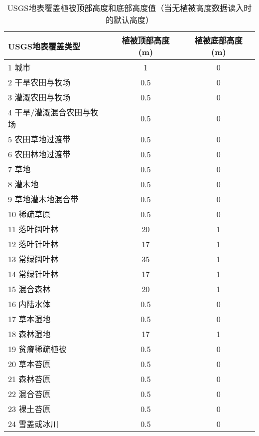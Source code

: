 \begin{table}[]
    \centering
    \caption{USGS地表覆盖植被顶部高度和底部高度值（当无植被高度数据读入时的默认高度）}
    \label{tab:USGS地表覆盖植被顶部高度和底部高度值}
    \begin{tabular}{@{}lcc@{}}
    \toprule
    USGS地表覆盖类型     & 植被顶部高度 (m) & 植被底部高度 (m) \\ \midrule
    1 城市           & 1          & 0          \\
    2 干旱农田与牧场      & 0.5        & 0          \\
    3 灌溉农田与牧场      & 0.5        & 0          \\
    4 干旱/灌溉混合农田与牧场 & 0.5        & 0          \\
    5 农田草地过渡带      & 0.5        & 0          \\
    6 农田林地过渡带      & 0.5        & 0          \\
    7 草地           & 0.5        & 0          \\
    8 灌木地          & 0.5        & 0          \\
    9 草地灌木地混合带     & 0.5        & 0          \\
    10 稀疏草原        & 0.5        & 0          \\
    11 落叶阔叶林       & 20         & 1          \\
    12 落叶针叶林       & 17         & 1          \\
    13 常绿阔叶林       & 35         & 1          \\
    14 常绿针叶林       & 17         & 1          \\
    15 混合森林        & 20         & 1          \\
    16 内陆水体        & 0.5        & 0          \\
    17 草本湿地        & 0.5        & 0          \\
    18 森林湿地        & 17         & 1          \\
    19 贫瘠稀疏植被      & 0.5        & 0          \\
    20 草本苔原        & 0.5        & 0          \\
    21 森林苔原        & 0.5        & 0          \\
    22 混合苔原        & 0.5        & 0          \\
    23 裸土苔原        & 0.5        & 0          \\
    24 雪盖或冰川       & 0.5        & 0          \\ \bottomrule
    \end{tabular}
\end{table}

